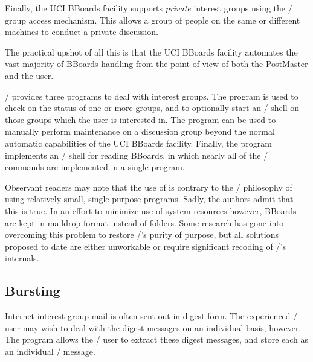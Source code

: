 Finally, the UCI BBoards facility supports {\it private} interest groups
using the \unix/ group access mechanism.
This allows a group of people on the same or different machines to conduct a
private discussion.

The practical upshot of all this is that the UCI BBoards facility automates
the vast majority of BBoards handling from the point of view of both the
PostMaster and the user.

\MH/ provides three programs to deal with interest groups.
The  program is used to check on the status of one or more groups,
and to optionally start an \MH/ shell on those groups which the user is
interested in.
The  program can be used to manually perform maintenance on a
discussion group beyond the normal automatic capabilities of the UCI BBoards
facility.
Finally,
the  program implements an \MH/ shell for reading BBoards,
in which nearly all of the \MH/ commands are implemented in a single program.

Observant readers may note that the use of  is contrary to the \MH/
philosophy of using relatively small, single-purpose programs.
Sadly,
the authors admit that this is true.
In an effort to minimize use of system resources however,
BBoards are kept in maildrop format instead of folders.%
Some research has gone into overcoming this problem to restore
\MH/'s purity of purpose,
but all solutions proposed to date are either unworkable or require
significant recoding of \MH/'s internals.

\subsection{Bursting}			%
Internet interest group mail is often sent out in digest form.
The experienced \MH/ user may wish to deal with the digest messages on
an individual basis, however.
The  program allows the \MH/ user to extract these digest
messages,
and store each as an individual \MH/ message.

